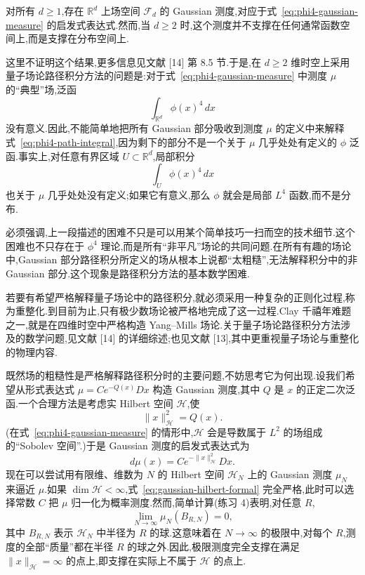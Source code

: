 \begin{proposition}\label{prop:gaussian-field-regularity}
对所有 $d\ge1$,存在 $\mathbb R^d$ 上场空间 $\mathcal F_d$ 的 Gaussian 测度,对应于式~\eqref{eq:phi4-gaussian-measure} 的启发式表达式.然而,当 $d\ge2$ 时,这个测度并不支撑在任何通常函数空间上,而是支撑在分布空间上.
\end{proposition}

这里不证明这个结果,更多信息见文献 [14] 第 8.5 节.于是,在 $d\ge2$ 维时空上采用量子场论路径积分方法的问题是:对于式~\eqref{eq:phi4-gaussian-measure} 中测度 $\mu$ 的“典型”场,泛函
\[
 \int_{\mathbb R^d}\phi(x)^4\,dx
\]
没有意义.因此,不能简单地把所有 Gaussian 部分吸收到测度 $\mu$ 的定义中来解释式~\eqref{eq:phi4-path-integral},因为剩下的部分不是一个关于 $\mu$ 几乎处处有定义的 $\phi$ 泛函.事实上,对任意有界区域 $U\subset\mathbb R^d$,局部积分
\[
 \int_U\phi(x)^4\,dx
\]
也关于 $\mu$ 几乎处处没有定义;如果它有意义,那么 $\phi$ 就会是局部 $L^4$ 函数,而不是分布.

必须强调,上一段描述的困难不只是可以用某个简单技巧一扫而空的技术细节.这个困难也不只存在于 $\phi^4$ 理论,而是所有“非平凡”场论的共同问题.在所有有趣的场论中,Gaussian 部分路径积分所定义的场从根本上说都“太粗糙”,无法解释积分中的非 Gaussian 部分.这个现象是路径积分方法的基本数学困难.

若要有希望严格解释量子场论中的路径积分,就必须采用一种复杂的正则化过程,称为重整化.到目前为止,只有极少数场论被严格地完成了这一过程.Clay 千禧年难题之一,就是在四维时空中严格构造 Yang--Mills 场论.关于量子场论路径积分方法涉及的数学问题,见文献 [14] 的详细综述;也见文献 [13],其中更重视量子场论与重整化的物理内容.

既然场的粗糙性是严格解释路径积分时的主要问题,不妨思考它为何出现.设我们希望从形式表达式 $\mu=Ce^{-Q(x)}Dx$ 构造 Gaussian 测度,其中 $Q$ 是 $x$ 的正定二次泛函.一个合理方法是考虑实 Hilbert 空间 $\mathcal H$,使
\[
 \|x\|_{\mathcal H}^2=Q(x).
\]
(在式~\eqref{eq:phi4-gaussian-measure} 的情形中,$\mathcal H$ 会是导数属于 $L^2$ 的场组成的“Sobolev 空间”.)于是 Gaussian 测度的启发式表达式为
\[
 d\mu(x)=Ce^{-\|x\|_{\mathcal H}^2}Dx.\label{eq:gaussian-hilbert-formal}
\]
现在可以尝试用有限维、维数为 $N$ 的 Hilbert 空间 $\mathcal H_N$ 上的 Gaussian 测度 $\mu_N$ 来逼近 $\mu$.如果 $\dim\mathcal H<\infty$,式~\eqref{eq:gaussian-hilbert-formal} 完全严格,此时可以选择常数 $C$ 把 $\mu$ 归一化为概率测度.然而,简单计算(练习 4)表明,对任意 $R$,
\[
 \lim_{N\to\infty}\mu_N(B_{R,N})=0,
\]
其中 $B_{R,N}$ 表示 $\mathcal H_N$ 中半径为 $R$ 的球.这意味着在 $N\to\infty$ 的极限中,对每个 $R$,测度的全部“质量”都在半径 $R$ 的球之外.因此,极限测度完全支撑在满足 $\|x\|_{\mathcal H}=\infty$ 的点上,即支撑在实际上不属于 $\mathcal H$ 的点上.

